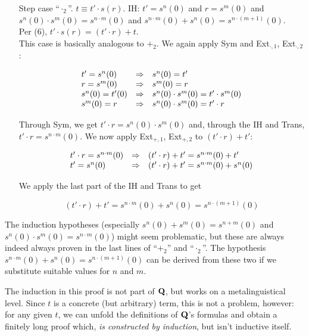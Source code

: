 \begin{itemize}
	\item[Step case ``$\cdot_2$''.] $t \equiv t' \cdot s(r)$. IH: $t' = s^n(0)$ and $r = s^m(0)$ and $s^n(0) \cdot s^m(0) = s^{n\cdot m}(0)$ and $s^{n \cdot m}(0) + s^n(0) = s^{n\cdot (m + 1)}(0)$.\\
	Per (6), $t' \cdot s(r) = (t' \cdot r) + t$.\\
	
	This case is basically analogous to $+_2$. We again apply Sym and Ext$_{\cdot,1}$, Ext$_{\cdot,2}$:
	
	$$
		\begin{array}{l l l}
			t' = s^n(0) & \Rightarrow & s^n(0) = t'\\
			r = s^m(0) & \Rightarrow & s^m(0) = r\\
			s^n(0) = t'(0) & \Rightarrow & s^n(0) \cdot s^m(0) = t' \cdot s^m(0)\\
			s^m(0) = r & \Rightarrow & s^n(0) \cdot s^m(0) = t' \cdot r
		\end{array}
	$$
	
	Through Sym, we get $t' \cdot r = s^n(0) \cdot s^m(0)$ and, through the IH and Trans, $t' \cdot r = s^{n\cdot m}(0)$. We now apply Ext$_{+,1}$, Ext$_{+,2}$ to $(t' \cdot r) + t'$:
	
	$$
		\begin{array}{l l l}
			t' \cdot r = s^{n\cdot m}(0) & \Rightarrow & (t' \cdot r) + t' = s^{n\cdot m}(0) + t'\\
			t' = s^n(0) & \Rightarrow & (t' \cdot r) + t' =  s^{n\cdot m}(0) + s^n(0)\\
		\end{array}
	$$
	
	We apply the last part of the IH and Trans to get
	
	$$
		(t' \cdot r) + t' =  s^{n\cdot m}(0) + s^n(0) = s^{n\cdot (m+1)}(0)
	$$
\end{itemize}

The induction hypotheses (especially $s^n(0) + s^m(0) = s^{n+m}(0)$ and $s^n(0) \cdot s^m(0) = s^{n\cdot m}(0)$) might seem problematic, but these are always indeed always proven in the last lines of ``$+_2$'' and ``$\cdot_2$''. The hypothesis $s^{n \cdot m}(0) + s^n(0) = s^{n\cdot (m + 1)}(0)$ can be derived from these two if we substitute suitable values for $n$ and $m$.

The induction in this proof is not part of $\mathbf{Q}$, but works on a metalinguistical level. Since $t$ is a concrete (but arbitrary) term, this is not a problem, however: for any given $t$, we can unfold the definitions of $\mathbf{Q}$'s formulas and obtain a finitely long proof which, {\em is constructed by induction}, but isn't inductive itself.

